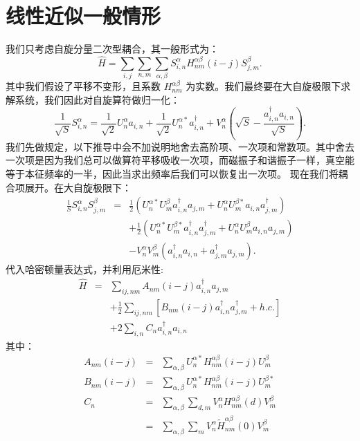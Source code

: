 \documentclass[UTF8]{ctexart}
\begin{document}
\section*{线性近似一般情形}
\noindent
我们只考虑自旋分量二次型耦合，其一般形式为：
\begin{equation}
\hat{H}=\sum_{i,j}\sum_{n,m}\sum_{\alpha,\beta}S_{i,n}^{\alpha}H_{nm}^{\alpha\beta}\left(i-j\right)S_{j,m}^{\beta}.
\end{equation}
其中我们假设了平移不变形，且系数 $H_{nm}^{\alpha\beta}$ 为实数。我们最终要在大自旋极限下求解系统，我们因此对自旋算符做归一化：
\begin{equation}
\frac{1}{\sqrt{S}}S_{i,n}^{\alpha}=\frac{1}{\sqrt{2}}U_{n}^{\alpha}a_{i,n}+\frac{1}{\sqrt{2}}U_{n}^{\alpha*}a_{i,n}^{\dagger}+V_{n}^{\alpha}\left(\sqrt{S}-\frac{a_{i,n}^{\dagger}a_{i,n}}{\sqrt{S}}\right).
\end{equation}
我们先做规定，以下推导中会不加说明地舍去高阶项、一次项和常数项。其中舍去一次项是因为我们总可以做算符平移吸收一次项，而磁振子和谐振子一样，真空能等于本征频率的一半，因此当求出频率后我们可以恢复出一次项。
现在我们将耦合项展开。在大自旋极限下：
\begin{eqnarray}
\frac{1}{S}S_{i,n}^{\alpha}S_{j,m}^{\beta} & = & \frac{1}{2}\left(U_{n}^{\alpha*}U_{m}^{\beta}a_{i,n}^{\dagger}a_{j,m}+U_{n}^{\alpha}U_{m}^{\beta*}a_{i,n}a_{j,m}^{\dagger}\right)\nonumber \\
 &  & +\frac{1}{2}\left(U_{n}^{\alpha*}U_{m}^{\beta*}a_{i,n}^{\dagger}a_{j,m}^{\dagger}+U_{n}^{\alpha}U_{m}^{\beta}a_{i,n}a_{j,m}\right)\nonumber \\
 &  & -V_{n}^{\alpha}V_{m}^{\beta}\left(a_{i,n}^{\dagger}a_{i,n}+a_{j,m}^{\dagger}a_{j,m}\right).
\end{eqnarray}
代入哈密顿量表达式，并利用厄米性:
\begin{eqnarray}
\hat{H} & = & \sum_{ij,nm}A_{nm}\left(i-j\right)a_{i,n}^{\dagger}a_{j,m}\nonumber \\
 &  & +\frac{1}{2}\sum_{ij,nm}\left[B_{nm}\left(i-j\right)a_{i,n}^{\dagger}a_{j,m}^{\dagger}+h.c.\right]\nonumber \\
 &  & +2\sum_{i,n}C_{n}a_{i,n}^{\dagger}a_{i,n}
\end{eqnarray}
其中：
\begin{eqnarray}
A_{nm}\left(i-j\right) & = & \sum_{\alpha,\beta}U_{n}^{\alpha*}H_{nm}^{\alpha\beta}\left(i-j\right)U_{m}^{\beta}\\
B_{nm}\left(i-j\right) & = & \sum_{\alpha,\beta}U_{n}^{\alpha*}H_{nm}^{\alpha\beta}\left(i-j\right)U_{m}^{\beta*}\\
C_{n} & = & \sum_{\alpha,\beta}\sum_{d,m}V_{n}^{\alpha}H_{nm}^{\alpha\beta}\left(d\right)V_{m}^{\beta}\nonumber \\
 & = & \sum_{\alpha,\beta}\sum_{m}V_{n}^{\alpha}\tilde{H}_{nm}^{\alpha\beta}\left(0\right)V_{m}^{\beta}
\end{eqnarray}
\end{document}
